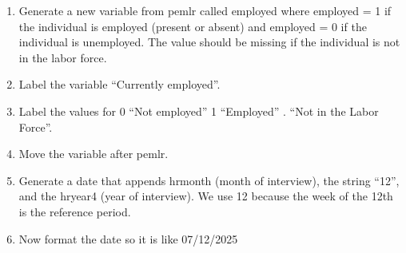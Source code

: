 \documentclass[
]{book}
\providecommand{\tightlist}{%
  \setlength{\itemsep}{0pt}\setlength{\parskip}{0pt}}
\begin{document}
\begin{enumerate}
\def\labelenumi{\arabic{enumi}.}
\tightlist
\item
  Generate a new variable from pemlr called employed where employed = 1 if the individual is employed (present or absent) and employed = 0 if the individual is unemployed. The value should be missing if the individual is not in the labor force.
\item
  Label the variable ``Currently employed''.
\item
  Label the values for 0 ``Not employed'' 1 ``Employed'' . ``Not in the Labor Force''.
\item
  Move the variable after pemlr.
\item
  Generate a date that appends hrmonth (month of interview), the string ``12'', and the hryear4 (year of interview). We use 12 because the week of the 12th is the reference period.
\item
  Now format the date so it is like 07/12/2025
\end{enumerate}


\end{document}
